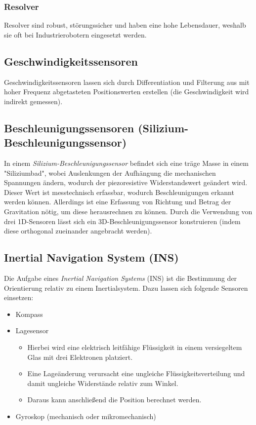 			\subsubsection{Resolver} %
				
				Resolver sind robust, störungssicher und haben eine hohe Lebensdauer, weshalb sie oft bei Industrierobotern eingesetzt werden.

		\subsection{Geschwindigkeitssensoren}
			Geschwindigkeitssensoren lassen sich \bspw durch Differentiation und Filterung aus mit hoher Frequenz abgetasteten Positionswerten erstellen (\dh die Geschwindigkeit wird indirekt gemessen).

		\subsection{Beschleunigungssensoren (Silizium-Beschleunigungssensor)}
			In einem \emph{Silizium-Beschleunigungssensor} befindet sich eine träge Masse in einem "Siliziumbad", wobei Auslenkungen der Aufhängung die mechanischen Spannungen ändern, wodurch der piezoresistive Widerstandswert geändert wird. Dieser Wert ist messtechnisch erfassbar, wodurch Beschleunigungen erkannt werden können. Allerdings ist eine Erfassung von Richtung und Betrag der Gravitation nötig, um diese herausrechnen zu können. Durch die Verwendung von drei 1D-Sensoren lässt sich ein 3D-Beschleunigungssensor konstruieren (indem diese orthogonal zueinander angebracht werden).

		\subsection{Inertial Navigation System (INS)} %
			Die Aufgabe eines \emph{Inertial Navigation Systems} (INS) ist die Bestimmung der Orientierung relativ zu einem Inertialsystem. Dazu lassen sich \bspw folgende Sensoren einsetzen:
			\begin{itemize}
				\item Kompass
				\item Lagesensor
					\begin{itemize}
						\item Hierbei wird eine elektrisch leitfähige Flüssigkeit in einem versiegeltem Glas mit drei Elektronen platziert.
						\item Eine Lageänderung verursacht eine ungleiche Flüssigkeitsverteilung und damit ungleiche Widerstände relativ zum Winkel.
						\item Daraus kann anschließend die Position berechnet werden.
					\end{itemize}
				\item Gyroskop (mechanisch oder mikromechanisch)
			\end{itemize}

